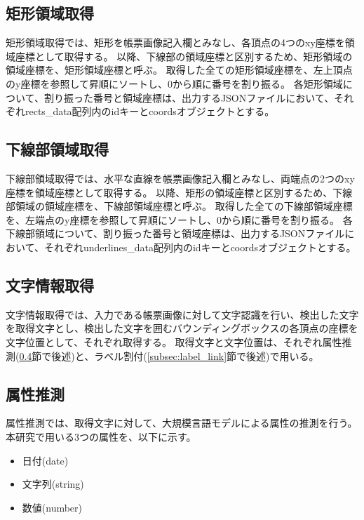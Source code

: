 \subsection{矩形領域取得}\label{subsec:rect_coords_obtainment}
矩形領域取得では、矩形を帳票画像記入欄とみなし、各頂点の4つのxy座標を領域座標として取得する。
以降、下線部の領域座標と区別するため、矩形領域の領域座標を、矩形領域座標と呼ぶ。
取得した全ての矩形領域座標を、左上頂点のy座標を参照して昇順にソートし、0から順に番号を割り振る。
各矩形領域について、割り振った番号と領域座標は、出力するJSONファイルにおいて、それぞれrects\_data配列内のidキーとcoordsオブジェクトとする。

\subsection{下線部領域取得}\label{subsec:underline_coords_obtainment}
下線部領域取得では、水平な直線を帳票画像記入欄とみなし、両端点の2つのxy座標を領域座標として取得する。
以降、矩形の領域座標と区別するため、下線部領域の領域座標を、下線部領域座標と呼ぶ。
取得した全ての下線部領域座標を、左端点のy座標を参照して昇順にソートし、0から順に番号を割り振る。
各下線部領域について、割り振った番号と領域座標は、出力するJSONファイルにおいて、それぞれunderlines\_data配列内のidキーとcoordsオブジェクトとする。

\subsection{文字情報取得}\label{subsec:char_information_obtainment}
文字情報取得では、入力である帳票画像に対して文字認識を行い、検出した文字を取得文字とし、検出した文字を囲むバウンディングボックスの各頂点の座標を文字位置として、それぞれ取得する。
取得文字と文字位置は、それぞれ属性推測(\ref{subsec:att_prediction}節で後述)と、ラベル割付(\ref{subsec:label_link}節で後述)で用いる。

\subsection{属性推測}\label{subsec:att_prediction}
属性推測では、取得文字に対して、大規模言語モデルによる属性の推測を行う。
本研究で用いる3つの属性を、以下に示す。

\begin{itemize}
    \item 日付(date)
    \item 文字列(string)
    \item 数値(number)
\end{itemize}

